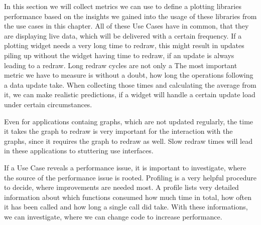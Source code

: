 In this section we will collect metrics we can use to define a plotting libraries performance based on the insights we gained into the usage of these libraries from the use cases in this chapter. All of these Use Cases have in common, that they are displaying live data, which will be delivered with a certain frequency. If a plotting widget needs a very long time to redraw, this might result in updates piling up without the widget having time to redraw, if an update is always leading to a redraw. Long redraw cycles are not only a 
The most important metric we have to measure is without a doubt, how long the operations following a data update take. When collecting those times and calculating the average from it, we can make realistic predictions, if a widget will handle a certain update load under certain circumstances.

Even for applications containg graphs, which are not updated regularly, the time it takes the graph to redraw is very important for the interaction with the graphs, since it requires the graph to redraw as well. Slow redraw times will lead in these applications to stuttering use interfaces.

If a Use Case reveals a performance issue, it is important to investigate, where the source of the performance issue is rooted. Profiling is a very helpful procedure to decide, where improvements are needed most. A profile lists very detailed information about which functions consumed how much time in total, how often it has been called and how long a single call did take. With these informations, we can investigate, where we can change code to increase performance.
